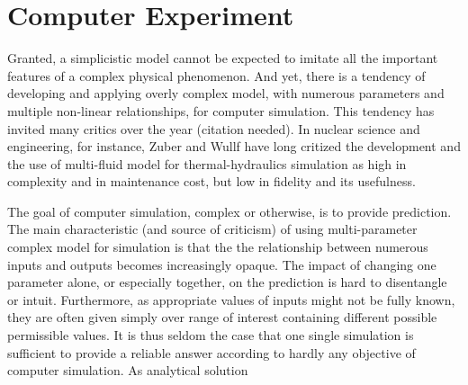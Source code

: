 \section{Computer Experiment}\label{sec:intro_computer_experiment}

Granted, a simplicistic model cannot be expected to imitate all the important features of a complex physical phenomenon.
And yet, there is a tendency of developing and applying overly complex model, with numerous parameters and multiple non-linear relationships, for computer simulation.
This tendency has invited many critics over the year (citation needed).
In nuclear science and engineering, for instance, Zuber \cite{Zuber2001} and Wullf \cite{Wulff2007} have long critized the development and the use of multi-fluid model for thermal-hydraulics simulation as high in complexity and in maintenance cost, but low in fidelity and its usefulness.

The goal of computer simulation, complex or otherwise, is to provide prediction.
The main characteristic (and source of criticism) of using multi-parameter complex model for simulation is that the the relationship between numerous inputs and outputs becomes increasingly opaque.
The impact of changing one parameter alone, or especially together, on the prediction is hard to disentangle or intuit.
Furthermore, as appropriate values of inputs might not be fully known, they are often given simply over range of interest containing different possible permissible values.
It is thus seldom the case that one single simulation is sufficient to provide a reliable answer according to hardly any objective of computer simulation.
As analytical solution